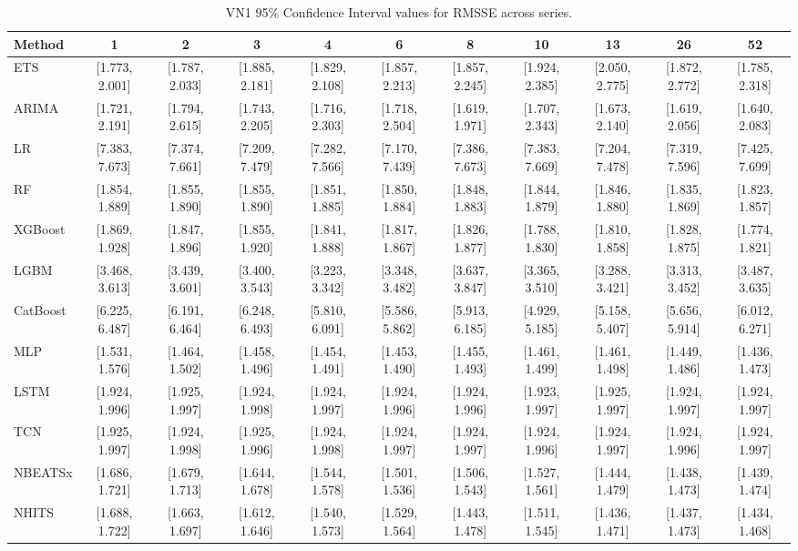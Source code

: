 \begin{table}[!ht]
\centering
\begin{adjustbox}{max width=\textwidth}
\begin{tabular}{lcccccccccc}
\toprule
Method & 1 & 2 & 3 & 4 & 6 & 8 & 10 & 13 & 26 & 52 \\
\midrule
ETS & [1.773, 2.001] & [1.787, 2.033] & [1.885, 2.181] & [1.829, 2.108] & [1.857, 2.213] & [1.857, 2.245] & [1.924, 2.385] & [2.050, 2.775] & [1.872, 2.772] & [1.785, 2.318] \\
ARIMA & [1.721, 2.191] & [1.794, 2.615] & [1.743, 2.205] & [1.716, 2.303] & [1.718, 2.504] & [1.619, 1.971] & [1.707, 2.343] & [1.673, 2.140] & [1.619, 2.056] & [1.640, 2.083] \\
LR & [7.383, 7.673] & [7.374, 7.661] & [7.209, 7.479] & [7.282, 7.566] & [7.170, 7.439] & [7.386, 7.673] & [7.383, 7.669] & [7.204, 7.478] & [7.319, 7.596] & [7.425, 7.699] \\
RF & [1.854, 1.889] & [1.855, 1.890] & [1.855, 1.890] & [1.851, 1.885] & [1.850, 1.884] & [1.848, 1.883] & [1.844, 1.879] & [1.846, 1.880] & [1.835, 1.869] & [1.823, 1.857] \\
XGBoost & [1.869, 1.928] & [1.847, 1.896] & [1.855, 1.920] & [1.841, 1.888] & [1.817, 1.867] & [1.826, 1.877] & [1.788, 1.830] & [1.810, 1.858] & [1.828, 1.875] & [1.774, 1.821] \\
LGBM & [3.468, 3.613] & [3.439, 3.601] & [3.400, 3.543] & [3.223, 3.342] & [3.348, 3.482] & [3.637, 3.847] & [3.365, 3.510] & [3.288, 3.421] & [3.313, 3.452] & [3.487, 3.635] \\
CatBoost & [6.225, 6.487] & [6.191, 6.464] & [6.248, 6.493] & [5.810, 6.091] & [5.586, 5.862] & [5.913, 6.185] & [4.929, 5.185] & [5.158, 5.407] & [5.656, 5.914] & [6.012, 6.271] \\
MLP & [1.531, 1.576] & [1.464, 1.502] & [1.458, 1.496] & [1.454, 1.491] & [1.453, 1.490] & [1.455, 1.493] & [1.461, 1.499] & [1.461, 1.498] & [1.449, 1.486] & [1.436, 1.473] \\
LSTM & [1.924, 1.996] & [1.925, 1.997] & [1.924, 1.998] & [1.924, 1.997] & [1.924, 1.996] & [1.924, 1.996] & [1.923, 1.997] & [1.925, 1.997] & [1.924, 1.997] & [1.924, 1.997] \\
TCN & [1.925, 1.997] & [1.924, 1.998] & [1.925, 1.996] & [1.924, 1.998] & [1.924, 1.997] & [1.924, 1.997] & [1.924, 1.996] & [1.924, 1.997] & [1.924, 1.996] & [1.924, 1.997] \\
NBEATSx & [1.686, 1.721] & [1.679, 1.713] & [1.644, 1.678] & [1.544, 1.578] & [1.501, 1.536] & [1.506, 1.543] & [1.527, 1.561] & [1.444, 1.479] & [1.438, 1.473] & [1.439, 1.474] \\
NHITS & [1.688, 1.722] & [1.663, 1.697] & [1.612, 1.646] & [1.540, 1.573] & [1.529, 1.564] & [1.443, 1.478] & [1.511, 1.545] & [1.436, 1.471] & [1.437, 1.473] & [1.434, 1.468] \\
\bottomrule
\end{tabular}
\end{adjustbox}
\caption{VN1 95\% Confidence Interval values for RMSSE across series.}
\label{tab:ci_vn1_rmsse}
\end{table}

